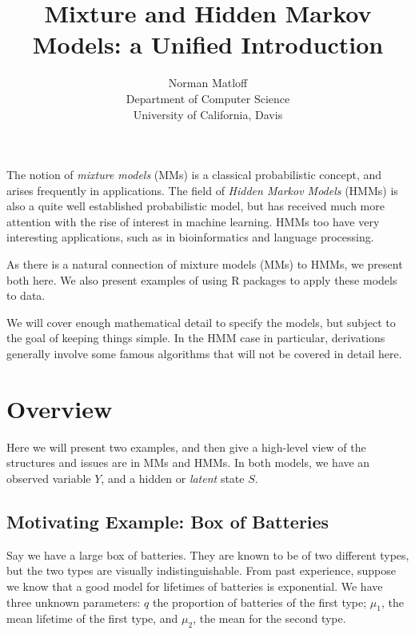 \documentclass[11pt]{article}
\begin{document}
 

\title{Mixture and Hidden Markov Models: a Unified Introduction}
\author{Norman Matloff \\
   Department of Computer Science \\
   University of California, Davis}

\maketitle

The notion of \textit{mixture models} (MMs)  is a classical
probabilistic concept, and arises frequently in applications.  The field
of \textit{Hidden Markov Models} (HMMs) is also a quite well established
probabilistic model, but has received much more attention with the rise
of interest in machine learning.  HMMs too have very interesting
applications, such as in bioinformatics and language processing.

As there is a natural connection of mixture models (MMs) to HMMs, we
present both here.  We also present examples of using R packages to
apply these models to data.

We will cover enough mathematical detail to specify the models, but
subject to the goal of keeping things simple.  In the HMM case in
particular, derivations generally involve some famous algorithms that
will not be covered in detail here.

\section{Overview}

Here we will present two examples, and then give a high-level view of
the structures and issues are in MMs and HMMs.  In both models, we have
an observed variable $Y$, and a hidden or \textit{latent} state $S$.

\subsection{Motivating Example:  Box of Batteries}

Say we have a large box of batteries.  They are known to be of two
different types, but the two types are visually indistinguishable.
From past experience, suppose we know that a good model for lifetimes of
batteries is exponential.  We have three unknown parameters: $q$ the
proportion of batteries of the first type; $\mu_1$, the mean lifetime of
the first type, and $\mu_2$, the mean for the second type.
\end{document}
